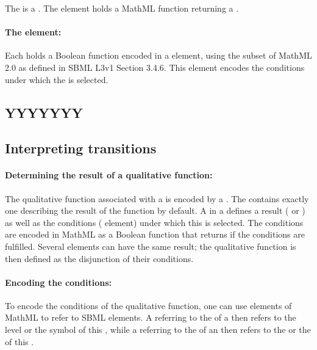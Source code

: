The  is a . The element  holds a MathML function returning a . 

\paragraph{The  element:}
Each  holds a Boolean function encoded in a  element, using the subset of MathML 2.0 as defined in SBML L3v1 Section 3.4.6.
This element encodes the conditions under which the  is selected.


\subsection{YYYYYYY}


\subsection*{\hypertarget{inter_trans}{Interpreting transitions}} %

\paragraph{Determining the result of a qualitative function:}
The qualitative function associated with a \Transition is encoded by a \ListOfFunctionTerms. The \Transition contains exactly one  describing the result of the function by default. A  in a \Transition defines a result ( or ) as well as the conditions ( element) under which this  is selected.
The conditions are encoded in MathML as a Boolean function that returns  if the conditions are fulfilled.
Several  elements can have the same result; the qualitative function is then defined as the disjunction of their conditions. 

\paragraph{Encoding the conditions:}
To encode the conditions of the qualitative function, one can use  elements of MathML to refer to SBML elements. A  referring to the  of a \QualitativeSpecies then refers to the level or the symbol of this \QualitativeSpecies, while a  referring to the  of an \Input then refers to the  or the  of this \Input.


